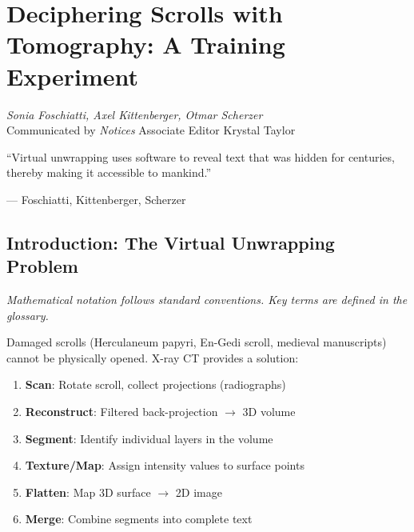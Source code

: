 \chapter{Deciphering Scrolls with Tomography: A Training Experiment}
\label{ch:tomography}
\cite{foschiatti2025tomography}

\begin{flushright}
\textit{Sonia Foschiatti, Axel Kittenberger, Otmar Scherzer}\\
Communicated by \textit{Notices} Associate Editor Krystal Taylor
\end{flushright}

\epigraph{``Virtual unwrapping uses software to reveal text that was hidden for centuries, thereby making it accessible to mankind.''}{--- Foschiatti, Kittenberger, Scherzer}

\begin{abstract}
X-ray computed tomography (CT) enables non-destructive reading of damaged scrolls. This chapter presents a complete didactic pipeline: from simulated X-ray projections (using visible light and transparent films) through filtered back-projection, manual segmentation, and Maximum Intensity Projection (MIP) to readable text. Includes Arduino-controlled rotation stage, Python/MATLAB reconstruction code, and the Archeolab software framework, \cite{foschiatti2025tomography}.
\end{abstract}

\section{Introduction: The Virtual Unwrapping Problem}

\noindent\textit{Mathematical notation follows standard conventions. Key terms are defined in the glossary.}\n
\label{sec:tom:intro}

Damaged scrolls (Herculaneum papyri, En-Gedi scroll, medieval manuscripts) cannot be physically opened. X-ray CT provides a solution: \cite{foschiatti2025tomography}
\begin{enumerate}
    \item \textbf{Scan}: Rotate scroll, collect projections (radiographs)
    \item \textbf{Reconstruct}: Filtered back-projection $\to$ 3D volume
    \item \textbf{Segment}: Identify individual layers in the volume
    \item \textbf{Texture/Map}: Assign intensity values to surface points
    \item \textbf{Flatten}: Map 3D surface $\to$ 2D image
    \item \textbf{Merge}: Combine segments into complete text
\end{enumerate}

